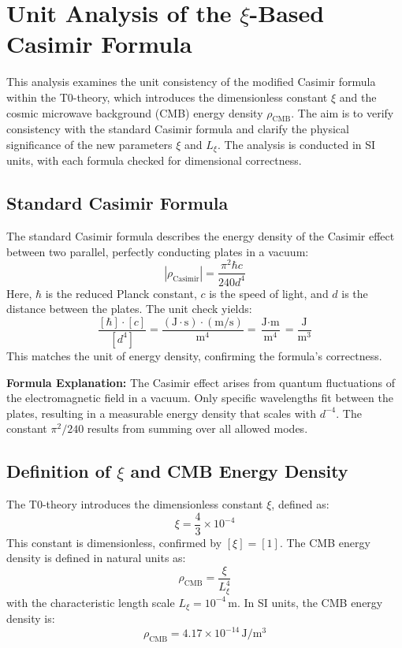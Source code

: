 \documentclass{article}
\begin{document}
	
	\section{Unit Analysis of the $\xi$-Based Casimir Formula}
	This analysis examines the unit consistency of the modified Casimir formula within the T0-theory, which introduces the dimensionless constant $\xi$ and the cosmic microwave background (CMB) energy density $\rho_{\text{CMB}}$. The aim is to verify consistency with the standard Casimir formula and clarify the physical significance of the new parameters $\xi$ and $L_\xi$. The analysis is conducted in SI units, with each formula checked for dimensional correctness.
	
	\subsection{Standard Casimir Formula}
	The standard Casimir formula describes the energy density of the Casimir effect between two parallel, perfectly conducting plates in a vacuum:
	\begin{equation}
		|\rho_{\text{Casimir}}| = \frac{\pi^2 \hbar c}{240 d^4}
	\end{equation}
	Here, $\hbar$ is the reduced Planck constant, $c$ is the speed of light, and $d$ is the distance between the plates. The unit check yields:
	\begin{equation}
		\frac{[\hbar] \cdot [c]}{[d^4]} = \frac{(\text{J} \cdot \text{s}) \cdot (\text{m}/\text{s})}{\text{m}^4} = \frac{\text{J} \cdot \text{m}}{\text{m}^4} = \frac{\text{J}}{\text{m}^3}
	\end{equation}
	This matches the unit of energy density, confirming the formula’s correctness.
	
	\textbf{Formula Explanation:} The Casimir effect arises from quantum fluctuations of the electromagnetic field in a vacuum. Only specific wavelengths fit between the plates, resulting in a measurable energy density that scales with $d^{-4}$. The constant $\pi^2/240$ results from summing over all allowed modes.
	
	\subsection{Definition of $\xi$ and CMB Energy Density}
	The T0-theory introduces the dimensionless constant $\xi$, defined as:
	\begin{equation}
		\xi = \frac{4}{3} \times 10^{-4}
	\end{equation}
	This constant is dimensionless, confirmed by $[\xi] = [1]$. The CMB energy density is defined in natural units as:
	\begin{equation}
		\rho_{\text{CMB}} = \frac{\xi}{L_\xi^4}
	\end{equation}
	with the characteristic length scale $L_\xi = 10^{-4} \, \text{m}$. In SI units, the CMB energy density is:
	\begin{equation}
		\rho_{\text{CMB}} = 4.17 \times 10^{-14} \, \text{J}/\text{m}^3
	\end{equation}
	
\end{document}
